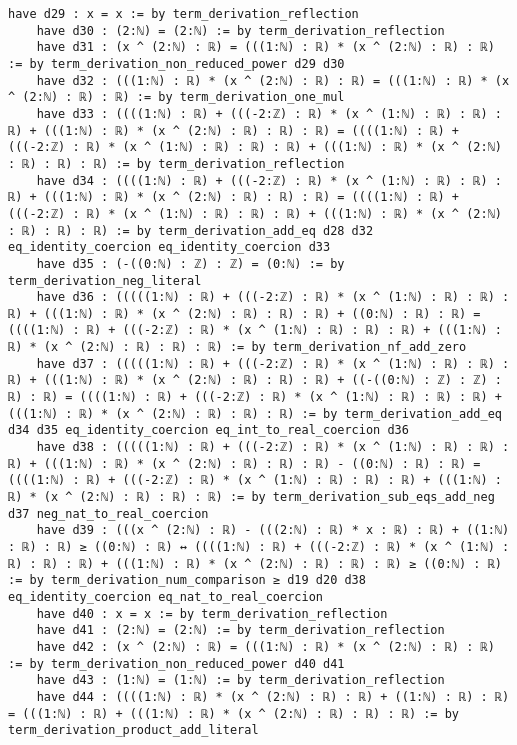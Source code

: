 \documentclass{article}
\begin{document}
\begin{tcolorbox}[colback=white!10, width=\linewidth]
\begin{lstlisting}[language=Lean4]
    have d29 : x = x := by term_derivation_reflection
    have d30 : (2:ℕ) = (2:ℕ) := by term_derivation_reflection
    have d31 : (x ^ (2:ℕ) : ℝ) = (((1:ℕ) : ℝ) * (x ^ (2:ℕ) : ℝ) : ℝ) := by term_derivation_non_reduced_power d29 d30
    have d32 : (((1:ℕ) : ℝ) * (x ^ (2:ℕ) : ℝ) : ℝ) = (((1:ℕ) : ℝ) * (x ^ (2:ℕ) : ℝ) : ℝ) := by term_derivation_one_mul
    have d33 : ((((1:ℕ) : ℝ) + (((-2:ℤ) : ℝ) * (x ^ (1:ℕ) : ℝ) : ℝ) : ℝ) + (((1:ℕ) : ℝ) * (x ^ (2:ℕ) : ℝ) : ℝ) : ℝ) = ((((1:ℕ) : ℝ) + (((-2:ℤ) : ℝ) * (x ^ (1:ℕ) : ℝ) : ℝ) : ℝ) + (((1:ℕ) : ℝ) * (x ^ (2:ℕ) : ℝ) : ℝ) : ℝ) := by term_derivation_reflection
    have d34 : ((((1:ℕ) : ℝ) + (((-2:ℤ) : ℝ) * (x ^ (1:ℕ) : ℝ) : ℝ) : ℝ) + (((1:ℕ) : ℝ) * (x ^ (2:ℕ) : ℝ) : ℝ) : ℝ) = ((((1:ℕ) : ℝ) + (((-2:ℤ) : ℝ) * (x ^ (1:ℕ) : ℝ) : ℝ) : ℝ) + (((1:ℕ) : ℝ) * (x ^ (2:ℕ) : ℝ) : ℝ) : ℝ) := by term_derivation_add_eq d28 d32 eq_identity_coercion eq_identity_coercion d33
    have d35 : (-((0:ℕ) : ℤ) : ℤ) = (0:ℕ) := by term_derivation_neg_literal
    have d36 : (((((1:ℕ) : ℝ) + (((-2:ℤ) : ℝ) * (x ^ (1:ℕ) : ℝ) : ℝ) : ℝ) + (((1:ℕ) : ℝ) * (x ^ (2:ℕ) : ℝ) : ℝ) : ℝ) + ((0:ℕ) : ℝ) : ℝ) = ((((1:ℕ) : ℝ) + (((-2:ℤ) : ℝ) * (x ^ (1:ℕ) : ℝ) : ℝ) : ℝ) + (((1:ℕ) : ℝ) * (x ^ (2:ℕ) : ℝ) : ℝ) : ℝ) := by term_derivation_nf_add_zero
    have d37 : (((((1:ℕ) : ℝ) + (((-2:ℤ) : ℝ) * (x ^ (1:ℕ) : ℝ) : ℝ) : ℝ) + (((1:ℕ) : ℝ) * (x ^ (2:ℕ) : ℝ) : ℝ) : ℝ) + ((-((0:ℕ) : ℤ) : ℤ) : ℝ) : ℝ) = ((((1:ℕ) : ℝ) + (((-2:ℤ) : ℝ) * (x ^ (1:ℕ) : ℝ) : ℝ) : ℝ) + (((1:ℕ) : ℝ) * (x ^ (2:ℕ) : ℝ) : ℝ) : ℝ) := by term_derivation_add_eq d34 d35 eq_identity_coercion eq_int_to_real_coercion d36
    have d38 : (((((1:ℕ) : ℝ) + (((-2:ℤ) : ℝ) * (x ^ (1:ℕ) : ℝ) : ℝ) : ℝ) + (((1:ℕ) : ℝ) * (x ^ (2:ℕ) : ℝ) : ℝ) : ℝ) - ((0:ℕ) : ℝ) : ℝ) = ((((1:ℕ) : ℝ) + (((-2:ℤ) : ℝ) * (x ^ (1:ℕ) : ℝ) : ℝ) : ℝ) + (((1:ℕ) : ℝ) * (x ^ (2:ℕ) : ℝ) : ℝ) : ℝ) := by term_derivation_sub_eqs_add_neg d37 neg_nat_to_real_coercion
    have d39 : (((x ^ (2:ℕ) : ℝ) - (((2:ℕ) : ℝ) * x : ℝ) : ℝ) + ((1:ℕ) : ℝ) : ℝ) ≥ ((0:ℕ) : ℝ) ↔ ((((1:ℕ) : ℝ) + (((-2:ℤ) : ℝ) * (x ^ (1:ℕ) : ℝ) : ℝ) : ℝ) + (((1:ℕ) : ℝ) * (x ^ (2:ℕ) : ℝ) : ℝ) : ℝ) ≥ ((0:ℕ) : ℝ) := by term_derivation_num_comparison ≥ d19 d20 d38 eq_identity_coercion eq_nat_to_real_coercion
    have d40 : x = x := by term_derivation_reflection
    have d41 : (2:ℕ) = (2:ℕ) := by term_derivation_reflection
    have d42 : (x ^ (2:ℕ) : ℝ) = (((1:ℕ) : ℝ) * (x ^ (2:ℕ) : ℝ) : ℝ) := by term_derivation_non_reduced_power d40 d41
    have d43 : (1:ℕ) = (1:ℕ) := by term_derivation_reflection
    have d44 : ((((1:ℕ) : ℝ) * (x ^ (2:ℕ) : ℝ) : ℝ) + ((1:ℕ) : ℝ) : ℝ) = (((1:ℕ) : ℝ) + (((1:ℕ) : ℝ) * (x ^ (2:ℕ) : ℝ) : ℝ) : ℝ) := by term_derivation_product_add_literal

\end{lstlisting}
\end{tcolorbox}
\end{document}
